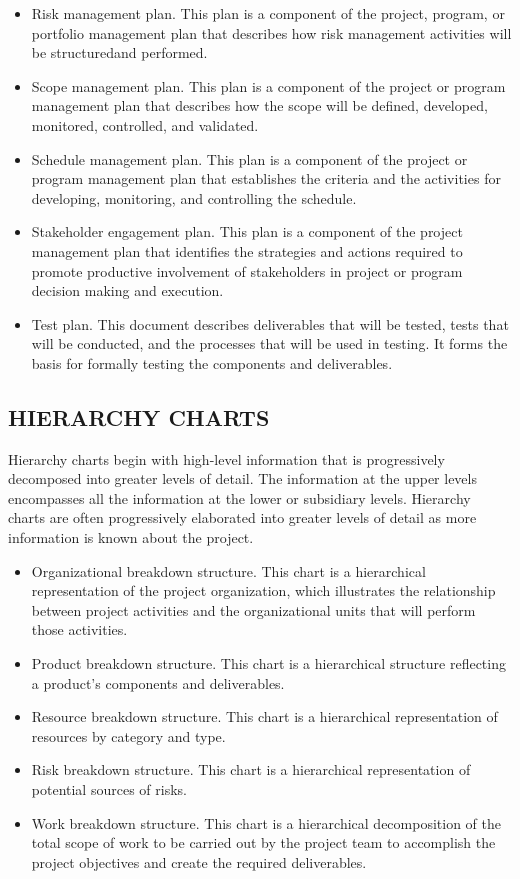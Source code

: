 \documentclass[11pt]{article}
\begin{document}
\begin{itemize}
\item Risk management plan. This plan is a component of the project, program, or portfolio management plan that describes how risk management activities will be structuredand performed.
\item Scope management plan. This plan is a component of the project or program management plan that describes how the scope will be defined, developed, monitored, controlled, and validated.
\item Schedule management plan. This plan is a component of the project or program management plan that establishes the criteria and the activities for developing, monitoring, and controlling the schedule.
\item Stakeholder engagement plan. This plan is a component of the project management plan that identifies the strategies and actions required to promote productive involvement of stakeholders in project or program decision making and execution.
\item Test plan. This document describes deliverables that will be tested, tests that will be conducted, and the processes that will be used in testing. It forms the basis for formally testing the components and deliverables.
\end{itemize}

\subsection{HIERARCHY CHARTS}
\label{sec:orge16ecb0}
Hierarchy charts begin with high-level information that is progressively decomposed into greater levels of detail. The information at the upper levels encompasses all the information at the lower or subsidiary levels. Hierarchy charts are often progressively elaborated into greater levels of detail as more information is known about the project.
\begin{itemize}
\item Organizational breakdown structure. This chart is a hierarchical representation of the project organization, which illustrates the relationship between project activities and the organizational units that will perform those activities.
\item Product breakdown structure. This chart is a hierarchical structure reflecting a product’s components and deliverables.
\item Resource breakdown structure. This chart is a hierarchical representation of resources by category and type.
\item Risk breakdown structure. This chart is a hierarchical representation of potential sources of risks.
\item Work breakdown structure. This chart is a hierarchical decomposition of the total scope of work to be carried out by the project team to accomplish the project objectives and create the required deliverables.
\end{itemize}
\end{document}
